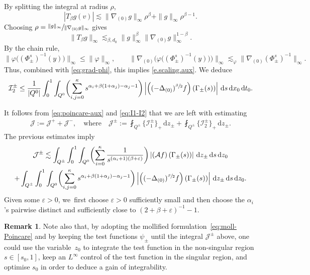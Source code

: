 \documentclass[JEP,XML,SOM,Unicode,NoFloatCountersInSection,published]{cedram}
\let\epsilon\varepsilon
\theoremstyle{definition}
\newtheorem{remark}[theorem]{Remark}
\newcommand{\cA}{{\mathcal A}}
\newcommand{\cI}{{\mathcal I}}
\newcommand{\cJ}{{\mathcal J}}
\newcommand{\dd}{{\, \mathrm d}}
\let\var\varepsilon
\begin{document}
By splitting the integral at radius \(\rho\),
\[
|T_\beta g(v)|
\lesssim \|\nabla_{(0)}g\|_\infty\rho^\beta+\|g\|_\infty\rho^{\beta-1}.
\]
Choosing \(\rho=\sfrac{\|g\|_\infty}{\|\nabla_{(0)}g\|_\infty}\) gives
\[
\|T_\beta g\|_\infty
\lesssim_{\beta,d_0}
\|g\|_\infty^\beta
\|\nabla_{(0)}g\|_\infty^{1-\beta}.
\]
By the chain rule,
\[
\|\varphi\big((\Phi_\pm^s)^{-1}(y)\big)\|_\infty\leq \|\varphi\|_\infty,
\qquad
\|\nabla_{(0)}\Big(\varphi\big((\Phi_\pm^s)^{-1}(y)\big)\Big)\|_\infty
\lesssim_\varphi
\|\nabla_{(0)}(\Phi_\pm^s)^{-1}\|_\infty.
\]
Thus, combined with \eqref{eq:grad-phi}, this implies \eqref{e.scaling.aux}.
We deduce
\begin{equation*}
\cI_2^\pm
\le \frac{1}{\vert Q^0\vert }\int_0^1 \int_{Q^0} \biggl(\sum_{i,j=0} ^\kappa s^{ \alpha_i +\beta(1+\alpha_j) - \alpha_j - 1} \biggr) \left|
\left((-\Delta_{(0)})^{\sfrac{\beta}{2}} f\right)\left(
\Gamma_\pm(s) \right) \right| \dd s \dd x_0 \dd t_0.
\end{equation*}

It follows from \eqref{eq:poincare-aux} and \eqref{eq:I1-I2} that
we are left with estimating
{
\begin{align*}
\cJ := \cJ^+ + \cJ^-, \quad \text{where} \quad
\cJ^{\pm} := \fint_{Q^\pm} \big\{\cI^\pm_1\big\}_+ \dd
z_\pm + \fint_{Q^\pm} \big\{\cI^\pm_2\big\}_+ \dd
z_\pm.
\end{align*}
}
The previous estimates imply
\begin{multline}
\label{eq:J-gen}
{\cJ^{\pm}}\lesssim \int_{Q^\pm} \int_0^1 \int_{Q^0}
\biggl(\sum_{i = 0}^\kappa \frac{1}{ s^{(\alpha_i+1)(\beta+\epsilon)}}
\biggr) \left| \left(\cA f \right) (\Gamma_\pm(s))\right|
\dd z_\pm \dd s
\dd z_0 \\
+ \int_{Q^\pm} \int_0^1\int_{Q^0} \biggl(\sum_{i,j =
0}^\kappa s^{\alpha_i +\beta(1+\alpha_j) - \alpha_j -1} \biggr) \left| \left(
(-\Delta_{(0)})^{\sfrac{\beta}{2}}f\right)\left(
\Gamma_\pm(s) \right) \right| \dd z_\pm \dd s \dd z_0.
\end{multline}
Given some $\var>0$, we~first choose $\epsilon>0$ sufficiently small
and then choose the $\alpha_i$'s pairwise distinct and sufficiently
close to $(2+\beta+\epsilon)^{-1}-1$.

\begin{remark}
\label{rmk_gain_int}
Note also that, by adopting the mollified
formulation~\eqref{eq:moll-Poincare} and by keeping the test
functions $\psi_\pm$ until the integral {$\cJ^{\pm}$} above, one could
use the variable~$z_0$ to integrate the test function in the
non-singular region $s \in [s_0,1]$, keep an $L ^\infty$ control
of the test function in the singular region, and optimise
$s_0$ in order to deduce a gain of integrability.
\end{remark}
\end{document}
